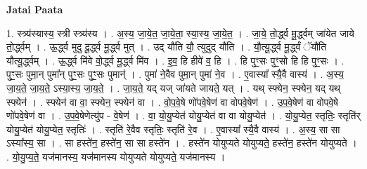 \documentclass[17pt]{extarticle}
\begin{document}
\textbf{Jatai Paata} \newline

1. स्त्र्य॑स्यास्य॒ स्त्री स्त्र्य॑स्य । . अ॒स्य॒ जा॒ये॒त॒ जा॒ये॒ता॒ स्या॒स्य॒ जा॒ये॒त॒ । . जा॒ये॒ तो॒र्द्ध्व मू॒र्द्ध्वम् जा॑येत जाये तो॒र्द्ध्वम् । . ऊ॒र्द्ध्व मुदु दू॒र्द्ध्व मू॒र्द्ध्व मुत् । . उद् यौ॑ति यौ॒ त्युदुद् यौ॑ति । . यौ॒त्यू॒र्द्ध्व मू॒र्द्ध्वं ॅयौ॑ति यौत्यू॒र्द्ध्वम् । . ऊ॒र्द्ध्व मि॑वे वो॒र्द्ध्व मू॒र्द्ध्व मि॑व । . इ॒व॒ हि हीवे॑ व॒ हि । . हि पुꣳ॒॒सः पुꣳ॒॒सो हि हि पुꣳ॒॒सः । . पुꣳ॒॒सः पुमा॒न् पुमा᳚न् पुꣳ॒॒सः पुꣳ॒॒सः पुमान्॑ । . पुमा॑ ने॒वैव पुमा॒न् पुमा॑ ने॒व । . ए॒वास्या᳚ स्यै॒वै वास्य॑ । . अ॒स्य॒ जा॒य॒ते॒ जा॒य॒ते॒ ऽस्या॒स्य॒ जा॒य॒ते॒ । . जा॒य॒ते॒ यद् यज् जा॑यते जायते॒ यत् । . यथ् स्फ्येन॒ स्फ्येन॒ यद् यथ् स्फ्येन॑ । . स्फ्येन॑ वा वा॒ स्फ्येन॒ स्फ्येन॑ वा । . वो॒प॒वे॒षे णो॑पवे॒षेण॑ वा वोपवे॒षेण॑ । . उ॒प॒वे॒षेण॑ वा वोपवे॒षे णो॑पवे॒षेण॑ वा । . उ॒प॒वे॒षेणेत्यु॑प - वे॒षेण॑ । . वा॒ यो॒यु॒प्येत॑ योयु॒प्येत॑ वा वा योयु॒प्येत॑ । . यो॒यु॒प्येत॒ स्तृतिः॒ स्तृति॑र् योयु॒प्येत॑ योयु॒प्येत॒ स्तृतिः॑ । . स्तृति॑ रे॒वैव स्तृतिः॒ स्तृति॑ रे॒व । . ए॒वास्या᳚ स्यै॒वै वास्य॑ । . अ॒स्य॒ सा सा ऽस्या᳚स्य॒ सा । . सा हस्ते॑न॒ हस्ते॑न॒ सा सा हस्ते॑न । . हस्ते॑न योयुप्यते योयुप्यते॒ हस्ते॑न॒ हस्ते॑न योयुप्यते । . यो॒यु॒प्य॒ते॒ यज॑मानस्य॒ यज॑मानस्य योयुप्यते योयुप्यते॒ यज॑मानस्य । \newline
\end{document}
